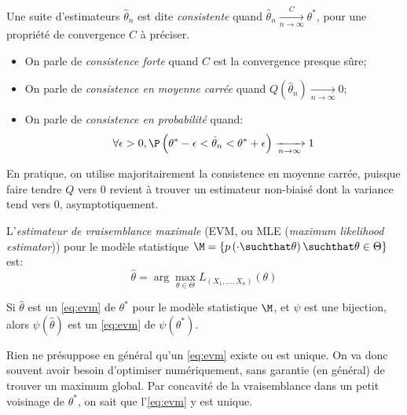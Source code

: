 \documentclass[info, math, french]{mpb-cours}
\def\model#1#2{p\left(#1\suchthat#2\right)}
\def\tstar{\theta^{*}}
\def\that{\hat{\theta}}
\def\EVM{\ref{eq:evm}\xspace}
\def\define#1{\emph{\textcolor{vulm}{#1}}}
\begin{document}
\begin{definition}
	Une suite d'estimateurs $\that_{n}$ est dite \define{consistente} quand $\that_{n} \xrightarrow[n \to \infty]{C} \tstar$, pour une propriété de convergence $C$ à préciser.
\end{definition}
\begin{itemize}
	\item On parle de \define{consistence forte} quand $C$ est la convergence presque sûre;
	\item On parle de \define{consistence en moyenne carrée} quand $Q(\that_{n}) \xrightarrow[n \to \infty]{} 0$;
	\item On parle de \define{consistence en probabilité} quand:
	      \begin{equation*}
		      \forall \epsilon > 0, \P\left(\tstar - \epsilon < \that_{n} < \tstar + \epsilon\right) \xrightarrow[n \to \infty]{} 1
	      \end{equation*}
\end{itemize}

En pratique, on utilise majoritairement la consistence en moyenne carrée, puisque faire tendre $Q$ vers $0$ revient à trouver un estimateur non-biaisé dont la variance tend vers $0$, asymptotiquement.

\begin{definition}
	L'\define{estimateur de vraisemblance maximale} (EVM, ou MLE (\textit{maximum likelihood estimator})) pour le modèle statistique $\M = \left\{\model{\cdot}{\theta}\suchthat \theta\in \Theta\right\}$ est:
	\begin{equation*}
		\that = \arg\max_{\theta \in \Theta} L_{\left(X_{1}, \ldots, X_{n}\right)}\left(\theta\right) \tag{EVM}\label{eq:evm}
	\end{equation*}
\end{definition}

\begin{remarque}
	Si $\that$ est un \EVM de $\tstar$ pour le modèle statistique $\M$, et $\psi$ est une bijection, alors $\psi(\that)$ est un \EVM de $\psi(\tstar)$.
\end{remarque}
Rien ne présuppose en général qu'un \EVM existe ou est unique.
On va donc souvent avoir besoin d'optimiser numériquement, sans garantie (en général) de trouver un maximum global.
Par concavité de la vraisemblance dans un petit voisinage de $\tstar$, on sait que l'\EVM y est unique.
\end{document}
